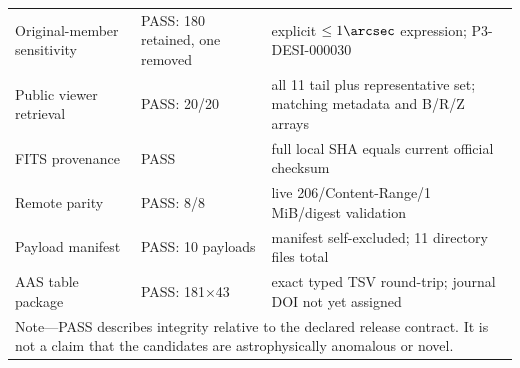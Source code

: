 \documentclass[twocolumn,linenumbers]{aastex702}
\begin{document}
\begin{center}
\begin{tabular}{p{}p{}p{}}
Original-member sensitivity & PASS: 180 retained, one removed & explicit $\le1\arcsec$ expression; P3-DESI-000030 \\
Public viewer retrieval & PASS: 20/20 & all 11 tail plus representative set; matching metadata and B/R/Z arrays \\
FITS provenance & PASS & full local SHA equals current official checksum \\
Remote parity & PASS: 8/8 & live 206/Content-Range/1 MiB/digest validation \\
Payload manifest & PASS: 10 payloads & manifest self-excluded; 11 directory files total \\
AAS table package & PASS: 181$\times$43 & exact typed TSV round-trip; journal DOI not yet assigned \\
\bottomrule
\multicolumn{3}{p{0.88\textwidth}}{\footnotesize Note---PASS describes integrity relative to the
declared release contract. It is not a claim that the candidates are astrophysically anomalous
or novel.}\\
\end{tabular}
\end{center}
\end{document}

